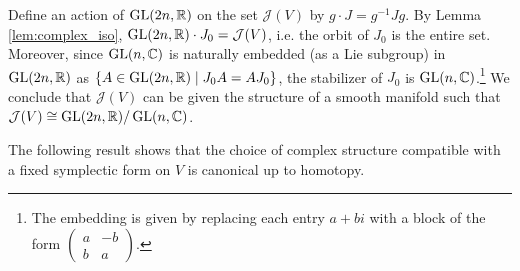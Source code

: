 \documentclass{amsart}
\begin{document}
\begin{remark}
    Define an action of $\operatorname{GL}(2n,\mathbb{R})$ on the set $\mathcal{J}(V)$ by $g\cdot J=g^{-1}Jg$.
    By Lemma \ref{lem:complex_iso}, $\operatorname{GL}(2n,\mathbb{R})\cdot J_0=\mathcal{J}(V)$, i.e. the orbit
    of $J_0$ is the entire set. Moreover, since $\operatorname{GL}(n,\mathbb{C})$ is naturally embedded (as a Lie
    subgroup) in $\operatorname{GL}(2n,\mathbb{R})$ as $\{A\in\operatorname{GL}(2n,\mathbb{R}) \mid J_0A=AJ_0\}$, the stabilizer of $J_0$ is
    $\operatorname{GL}(n,\mathbb{C})$.\footnote{The embedding is given by replacing each entry $a+bi$ with a block of the
    form $\begin{pmatrix}a&-b\\b&a\end{pmatrix}$.}
    We conclude that $\mathcal{J}(V)$ can be given the structure of a smooth manifold such
    that $\mathcal{J}(V)\cong\operatorname{GL}(2n,\mathbb{R})/\operatorname{GL}(n,\mathbb{C})$.
    \label{rem:gl}
\end{remark}

The following result shows that the choice of complex structure compatible with a fixed
symplectic form on $V$ is canonical up to homotopy.
\end{document}
